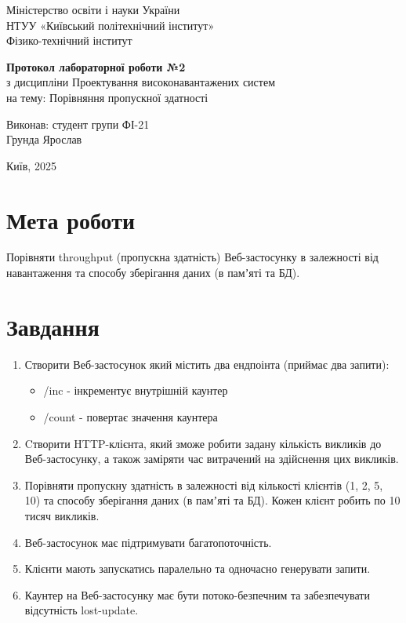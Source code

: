\documentclass[12pt,a4paper]{article}
\begin{document}
\begin{titlepage}
\centering
Міністерство освіти і науки України \\
НТУУ «Київський політехнічний інститут» \\
Фізико-технічний інститут
\vfill

\textbf{Протокол лабораторної роботи №2} \\ %
з дисципліни Проектування високонавантажених систем \\ %
на тему: Порівняння пропускної здатності
\vfill

\begin{flushright}
Виконав: студент групи ФІ-21 \\
Грунда Ярослав \\
\end{flushright}

\vfill
Київ, 2025
\end{titlepage}

\section*{Мета роботи}
Порівняти throughput (пропускна здатність) Веб-застосунку в залежності від навантаження та способу зберігання даних (в памʼяті та БД).


\section*{Завдання}
\begin{enumerate}
\item Створити Веб-застосунок який містить два ендпоінта (приймає два запити):\\
\begin{itemize}
\item /inc - інкрементує внутрішній каунтер\\
\item /count - повертає значення каунтера\\
\end{itemize}
\item Cтворити HTTP-клієнта, який зможе робити задану кількість викликів до Веб-застосунку, а також заміряти час витрачений на здійснення цих викликів.
\item Порівняти пропускну здатність в залежності від кількості клієнтів (1, 2, 5, 10) та способу зберігання даних (в памʼяті та БД). 
Кожен клієнт робить по 10 тисяч викликів.
\item Веб-застосунок має підтримувати багатопоточність.
\item Клієнти мають запускатись паралельно та одночасно генерувати запити.
\item Каунтер на Веб-застосунку має бути потоко-безпечним та забезпечувати відсутність lost-update.
\end{enumerate}
\tableofcontents
\newpage
\end{document}
